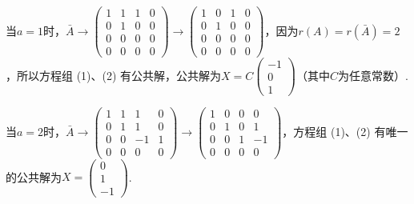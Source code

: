 \begin{enumerate}
          当$a=1$时，$\bar{A}\rightarrow\begin{pmatrix}
                  1 & 1 & 1 & 0 \\
                  0 & 1 & 0 & 0 \\
                  0 & 0 & 0 & 0 \\
                  0 & 0 & 0 & 0
              \end{pmatrix}\rightarrow\begin{pmatrix}
                  1 & 0 & 1 & 0 \\
                  0 & 1 & 0 & 0 \\
                  0 & 0 & 0 & 0 \\
                  0 & 0 & 0 & 0
              \end{pmatrix}$，因为$r(A)=r(\bar{A})=2$，所以方程组 (1)、(2) 有公共解，公共解为$X=C\begin{pmatrix} -1 \\ 0  \\ 1 \end{pmatrix}$（其中$C$为任意常数）.

          当$a=2$时，$\bar{A}\rightarrow\begin{pmatrix}
                  1 & 1 & 1  & 0 \\
                  0 & 1 & 1  & 0 \\
                  0 & 0 & -1 & 1 \\
                  0 & 0 & 0  & 0
              \end{pmatrix}\rightarrow\begin{pmatrix}
                  1 & 0 & 0 & 0  \\
                  0 & 1 & 0 & 1  \\
                  0 & 0 & 1 & -1 \\
                  0 & 0 & 0 & 0
              \end{pmatrix}$，方程组 (1)、(2) 有唯一的公共解为$X=\begin{pmatrix}
                  0 \\
                  1 \\
                  -1
              \end{pmatrix}$.
\end{enumerate}

